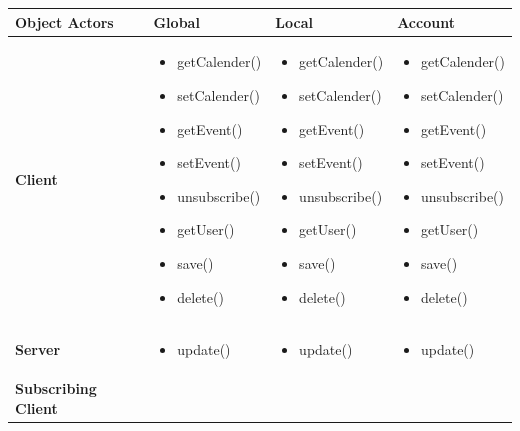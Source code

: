 \begin{tabular}{|p{2.9cm}|p{3.6cm}|p{3.6cm}|p{3.6cm}|}
\hline
\textbf{Object Actors}
&
\textbf{Global}
&
\textbf{Local}
&
\textbf{Account} \\
\hline
\textbf{Client}
& 
\begin{itemize}
\item getCalender() 
\item setCalender() 
\item getEvent()
\item setEvent()
\item unsubscribe()
\item getUser()
\item save()
\item delete()
\end{itemize} 
& 
\begin{itemize}
\item getCalender() 
\item setCalender() 
\item getEvent() 
\item setEvent()
\item unsubscribe()
\item getUser()
\item save()
\item delete()
\end{itemize} 
&
\begin{itemize}
\item getCalender() 
\item setCalender() 
\item getEvent() 
\item setEvent()
\item unsubscribe()
\item getUser()
\item save()
\item delete()
\end{itemize} 
 \\ \hline
\textbf{Server}
& 
\begin{itemize}
\item update()
\end{itemize} 
& 
\begin{itemize}
\item update()
\end{itemize} 
&
\begin{itemize}
\item update()
\end{itemize} 
 \\ \hline
\textbf{Subscribing Client}

\end{tabular}
